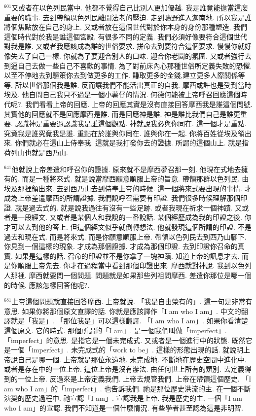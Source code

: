 \documentclass{book}
\begin{document}
$^{601}$又或者在以色列民當中.
他都不覺得自己比別人更加優越.
我是誰竟能擔當這麼重要的職事.
去到帶領以色列民離開法老的壓迫.
走到曠野進入迦南地.
所以我是誰將個焦點放在自己的身上.
又或者放在這個世代對於你本身的身份那種塑造.
我們這個時代對於我是誰這個宮殿.
有很多不同的定義.
我們必須好像要符合這個世代對我是誰.
又或者我應該成為誰的世俗要求.
拼命去到要符合這個要求.
慢慢你就好像失去了自己一樣.
你就為了要迎合別人的口味.
迎合你老闆的氛圍.
又或者強行去到逼自己去做一些自己不喜歡的事情.
為了對前床內心那種世俗所定義失敗的恐懼.
以至不停地去到驅策你去到做更多的工作.
賺取更多的金錢,建立更多人際關係等等.
所以世俗那個我是誰.
反而讓我們不能活出真正的自我.
摩西或許也是受到當時埃及.
他自問自己我只不過是一個小薯仔的情況.
何德何能被上帝呼召回應這個時代呢?.
我們看看上帝的回應.
上帝的回應其實是沒有直接回答摩西我是誰這個問號.
其實他的回應就不是回應摩西是誰.
而是回應神是誰.
神是誰比我們自己是誰更重要.
認識神是重要過認識我是誰這個觀點.
神就說我必與你同在.
這一個才是重點.
究竟我是誰究竟我是誰.
重點在於誰與你同在.
誰與你在一起.
你將百姓從埃及領出來.
你們就必在這山上侍奉我.
這就是我打發你去的證據.
所謂的這個山上.
就是指荷列山也就是西乃山.

$^{641}$他就說上帝差遣和呼召你的證據.
原來就不是摩西夢召那一刻.
他現在式地去擁有的.
而是一種將來式.
就是說當摩西願意順服上帝的旨意.
帶領那群以色列民.
由埃及那裡領出來.
去到西乃山去到侍奉上帝的時候.
這一個將來式要出現的事情.
才成為上帝差遣摩西的所謂證據.
我們說呼召需要有印證.
我們很多時候理解那個印證.
就是過去式的.
就是說我過往有沒有一些足跡.
或者我現在祈求一個神蹟.
又或者是一段經文.
又或者是某個人和我說的一番說話.
某個經歷成為我的印證之後.
你才可以去到他的答上.
但這個經文似乎就倒轉想法.
他就發現這個所謂的印證.
不是過去和現在式.
而是將來式.
而是你願意順服上帝.
帶領以色列民去到西乃山腳下.
你見到一個這樣的現象.
才成為那個證據.
才成為那個印證.
去到印證你召命的真實.
如果是這樣的話.
召命的印證並不是你拿了一塊神蹟.
知道上帝的訊息才去.
而是你順服上帝先去.
你才在過程當中看到那個印證出來.
摩西就對神說.
我到以色列人那裡.
摩西就要問一個問題.
問題就是如果那些列祖問摩西.
差遣你那位是哪一個的時候.
應該怎樣回答他呢?.

$^{681}$上帝這個問題就直接回答摩西.
上帝就說.
「我是自由榮有的」.
這一句是非常有意思.
如果你將那個原文直譯的話.
你就是應該譯作「I am who I am」.
中文的翻譯就是「我是」.
「那位我是」可以這樣翻譯.
「I am who I am」.
如果你看清楚這個原文.
它的時式.
那個所謂的「I am」.
是一個我們叫做「imperfect」.
「imperfect」的意思.
是指它是一個未完成式.
又或者是一個進行中的狀態.
既然它是一個「imperfect」.
未完成式的「work to be」.
這樣的形態出現的話.
就說明上帝說自己是哪一個.
上帝就是那位永遠地.
未完成地.
不斷地在歷史空間中進化中.
或者是存在中的一位上帝.
這位上帝是沒有辦法.
由任何世上所有的類別.
去定義得到的一位上帝.
反過來是上帝定義我們.
上帝去規管我們.
上帝在帶領這個歷史.
「I am who I am」的「imperfect」.
也告訴我們.
祂是那位歷史洪流的主.
在一個不斷演變的歷史過程中.
祂宣認「I am」.
宣認我是上帝.
我是歷史的主.
一個「I am who I am」的宣認.
我們不知道是一個什麼情況.
有些學者甚至認為這是非明智.
\end{document}
